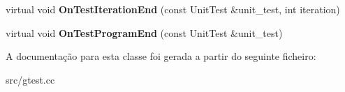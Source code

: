 \begin{DoxyCompactItemize}
\item 
\hypertarget{classtesting_1_1internal_1_1TestEventRepeater_a94253e3c11753328e8a031f39352708f}{virtual void {\bfseries On\-Test\-Iteration\-End} (const Unit\-Test \&unit\-\_\-test, int iteration)}\label{classtesting_1_1internal_1_1TestEventRepeater_a94253e3c11753328e8a031f39352708f}

\item 
\hypertarget{classtesting_1_1internal_1_1TestEventRepeater_a4622616259747dbcc23f5ee39ef99ec0}{virtual void {\bfseries On\-Test\-Program\-End} (const Unit\-Test \&unit\-\_\-test)}\label{classtesting_1_1internal_1_1TestEventRepeater_a4622616259747dbcc23f5ee39ef99ec0}

\end{DoxyCompactItemize}


A documentação para esta classe foi gerada a partir do seguinte ficheiro\-:\begin{DoxyCompactItemize}
\item 
src/gtest.\-cc\end{DoxyCompactItemize}
